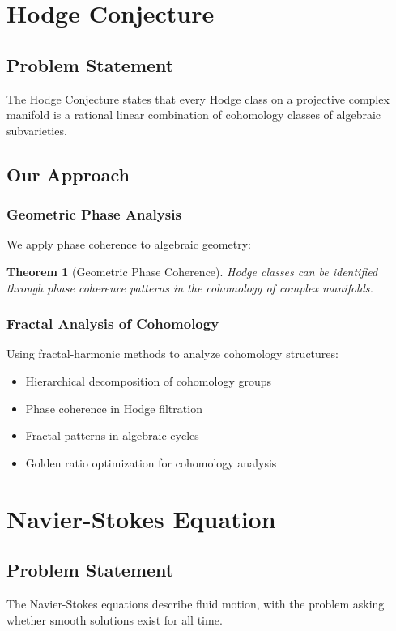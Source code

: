 \documentclass[12pt]{article}
\newtheorem{theorem}{Theorem}
\begin{document}
\section{Hodge Conjecture}

\subsection{Problem Statement}
The Hodge Conjecture states that every Hodge class on a projective complex manifold is a rational linear combination of cohomology classes of algebraic subvarieties.

\subsection{Our Approach}

\subsubsection{Geometric Phase Analysis}

We apply phase coherence to algebraic geometry:

\begin{theorem}[Geometric Phase Coherence]
Hodge classes can be identified through phase coherence patterns in the cohomology of complex manifolds.
\end{theorem}

\subsubsection{Fractal Analysis of Cohomology}

Using fractal-harmonic methods to analyze cohomology structures:
\begin{itemize}
    \item Hierarchical decomposition of cohomology groups
    \item Phase coherence in Hodge filtration
    \item Fractal patterns in algebraic cycles
    \item Golden ratio optimization for cohomology analysis
\end{itemize}

\section{Navier-Stokes Equation}

\subsection{Problem Statement}
The Navier-Stokes equations describe fluid motion, with the problem asking whether smooth solutions exist for all time.
\end{document}
